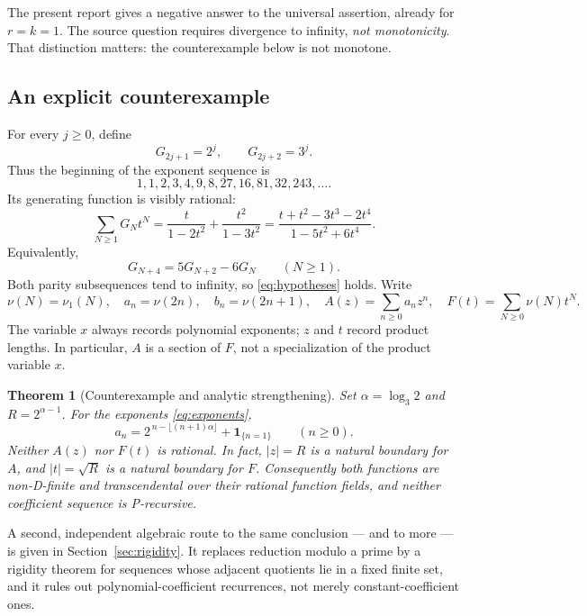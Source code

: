 \documentclass[11pt,letterpaper]{article}
\numberwithin{equation}{section}
\newtheorem{theorem}{Theorem}[section]
\theoremstyle{definition}
\theoremstyle{remark}
\newcommand{\ind}[1]{\boldsymbol{1}_{\{#1\}}}
\begin{document}
The present report gives a negative answer to the universal assertion,
already for $r=k=1$. The source question requires divergence to infinity,
\emph{not monotonicity}. That distinction matters: the counterexample below
is not monotone.

\subsection{An explicit counterexample}
For every $j\ge0$, define
\begin{equation}\label{eq:exponents}
 G_{2j+1}=2^j,\qquad G_{2j+2}=3^j.
\end{equation}
Thus the beginning of the exponent sequence is
\[
 1,1,2,3,4,9,8,27,16,81,32,243,\ldots.
\]
Its generating function is visibly rational:
\begin{equation}\label{eq:inputgf}
 \sum_{N\ge1}G_Nt^N
 =\frac{t}{1-2t^2}+\frac{t^2}{1-3t^2}
 =\frac{t+t^2-3t^3-2t^4}{1-5t^2+6t^4}.
\end{equation}
Equivalently,
\begin{equation}\label{eq:inputrec}
 G_{N+4}=5G_{N+2}-6G_N\qquad(N\ge1).
\end{equation}
Both parity subsequences tend to infinity, so \eqref{eq:hypotheses} holds.
Write
\begin{equation}\label{eq:ABF}
 \nu(N)=\nu_1(N),\quad a_n=\nu(2n),\quad b_n=\nu(2n+1),
 \quad A(z)=\sum_{n\ge0}a_nz^n,\quad F(t)=\sum_{N\ge0}\nu(N)t^N.
\end{equation}
The variable $x$ always records polynomial exponents; $z$ and $t$ record
product lengths. In particular, $A$ is a section of $F$, not a specialization
of the product variable $x$.

\begin{theorem}[Counterexample and analytic strengthening]\label{thm:main}
Set $\alpha=\log_3 2$ and $R=2^{\alpha-1}$. For the exponents
\eqref{eq:exponents},
\begin{equation}\label{eq:mainformula}
 a_n=2^{\,n-\lfloor(n+1)\alpha\rfloor}+\ind{n=1}\qquad(n\ge0).
\end{equation}
Neither $A(z)$ nor $F(t)$ is rational. In fact, $|z|=R$ is a natural boundary
for $A$, and $|t|=\sqrt R$ is a natural boundary for $F$. Consequently both
functions are non-D-finite and transcendental over their rational function
fields, and neither coefficient sequence is P-recursive.
\end{theorem}

A second, independent algebraic route to the same conclusion --- and to more ---
is given in Section~\ref{sec:rigidity}. It replaces reduction modulo a prime
by a rigidity theorem for sequences whose adjacent quotients lie in a fixed
finite set, and it rules out polynomial-coefficient recurrences, not merely
constant-coefficient ones.
\end{document}
